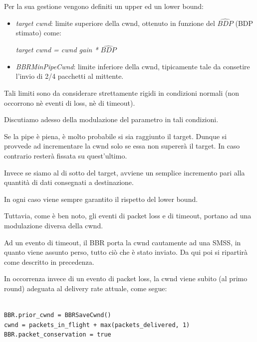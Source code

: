Per la sua gestione vengono definiti un upper ed un lower bound:

\begin{itemize}

\item \textit{target cwnd}: limite superiore della cwnd, ottenuto in funzione del $ \widehat{BDP} $ (BDP stimato) come:

\textit{target cwnd = cwnd gain * $ \widehat{BDP} $}

\item \textit{BBRMinPipeCwnd}: limite inferiore della cwnd, tipicamente tale da consetire l'invio di 2/4 pacchetti al mittente.

\end{itemize}

Tali limiti sono da considerare strettamente rigidi in condizioni normali (non occorrono nè eventi di loss, nè di timeout). \bigskip

Discutiamo adesso della modulazione del parametro in tali condizioni. \bigskip

Se la pipe è piena, è molto probabile si sia raggiunto il target. Dunque si provvede ad incrementare la cwnd solo se essa non supererà il target. In caso contrario resterà fissata su quest'ultimo. \bigskip 

Invece se siamo al di sotto del target, avviene un semplice incremento pari alla quantità di dati consegnati a destinazione. \bigskip

In ogni caso viene sempre garantito il rispetto del lower bound. \bigskip

Tuttavia, come è ben noto, gli eventi di packet loss e di timeout, portano ad una modulazione diversa della cwnd. \bigskip

Ad un evento di timeout, il BBR porta la cwnd cautamente ad una SMSS, in quanto viene assunto perso, tutto ciò che è stato inviato. Da qui poi si ripartirà come descritto in precedenza. \bigskip

In occorrenza invece di un evento di packet loss, la cwnd viene subito (al primo round) adeguata al delivery rate attuale, come segue:

\begin{lstlisting}[caption=BBR enter in loss recovery]

BBR.prior_cwnd = BBRSaveCwnd()
cwnd = packets_in_flight + max(packets_delivered, 1)
BBR.packet_conservation = true

\end{lstlisting}

